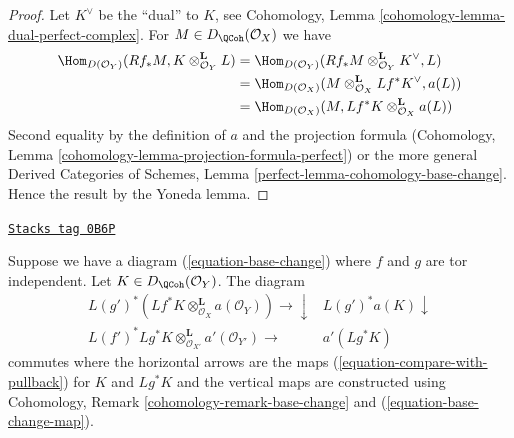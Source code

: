 \begin{proof}
Let $K^\vee$ be the ``dual'' to $K$, see
Cohomology, Lemma \ref{cohomology-lemma-dual-perfect-complex}.
For $M \in D_\QCoh(\mathcal{O}_X)$ we have
\begin{align*}
\Hom_{D(\mathcal{O}_Y)}(Rf_*M, K \otimes^\mathbf{L}_{\mathcal{O}_Y} L)
& =
\Hom_{D(\mathcal{O}_Y)}(
Rf_*M \otimes^\mathbf{L}_{\mathcal{O}_Y} K^\vee, L) \\
& =
\Hom_{D(\mathcal{O}_X)}(
M \otimes^\mathbf{L}_{\mathcal{O}_X} Lf^*K^\vee, a(L)) \\
& =
\Hom_{D(\mathcal{O}_X)}(M,
Lf^*K \otimes^\mathbf{L}_{\mathcal{O}_X} a(L))
\end{align*}
Second equality by the definition of $a$ and the projection formula
(Cohomology, Lemma \ref{cohomology-lemma-projection-formula-perfect})
or the more general Derived Categories of Schemes, Lemma
\ref{perfect-lemma-cohomology-base-change}.
Hence the result by the Yoneda lemma.
\end{proof}

\begin{lemma}
\label{duality-lemma-restriction-compare-with-pullback}
\href{https://stacks.math.columbia.edu/tag/0B6P}{\texttt{Stacks tag 0B6P}}

Suppose we have a diagram (\ref{equation-base-change}) where $f$ and $g$
are tor independent. Let $K \in D_\QCoh(\mathcal{O}_Y)$. The diagram
$$
\begin{array}{cc}L(g')^*(Lf^*K \otimes^\mathbf{L}_{\mathcal{O}_X} a(\mathcal{O}_Y))
\longrightarrow\downarrow & L(g')^*a(K) \downarrow \\ L(f')^*Lg^*K \otimes_{\mathcal{O}_{X'}}^\mathbf{L} a'(\mathcal{O}_{Y'})
\longrightarrow & a'(Lg^*K)\end{array}
$$
commutes where the horizontal arrows are the maps
(\ref{equation-compare-with-pullback}) for $K$ and $Lg^*K$
and the vertical maps are constructed using
Cohomology, Remark \ref{cohomology-remark-base-change} and
(\ref{equation-base-change-map}).
\end{lemma}

